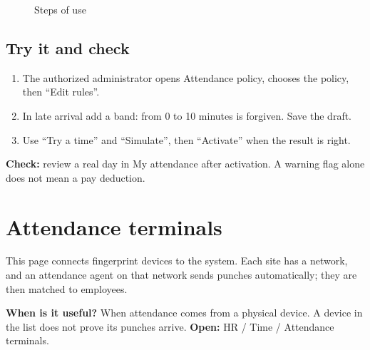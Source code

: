 \begin{figure}[H]
\centering
{}
\rclegend
\caption{Steps of use}
\label{fig:hr-feature-attendance-policy-flow}
\end{figure}

\subsection{Try it and check}

\begin{enumerate}
  \item The authorized administrator opens Attendance policy, chooses the policy, then “Edit rules”.
  \item In late arrival add a band: from 0 to 10 minutes is forgiven. Save the draft.
  \item Use “Try a time” and “Simulate”, then “Activate” when the result is right.
\end{enumerate}

\textbf{Check:} review a real day in My attendance after activation. A warning flag alone does not mean a pay deduction.

\clearpage
\section{Attendance terminals}
\label{sec:hr-feature-attendance-terminals}

This page connects fingerprint devices to the system. Each site has a network, and an attendance agent on that network sends punches automatically; they are then matched to employees.

\textbf{When is it useful?} When attendance comes from a physical device. A device in the list does not prove its punches arrive. \textbf{Open:} HR / Time / Attendance terminals.

